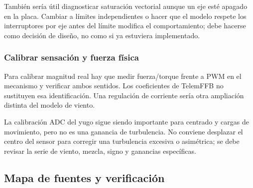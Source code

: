 \documentclass[11pt,a4paper]{article}
\begin{document}
También sería útil diagnosticar saturación vectorial aunque un eje esté apagado en la placa. Cambiar a límites independientes o hacer que el modelo respete los interruptores por eje antes del límite modifica el comportamiento; debe hacerse como decisión de diseño, no como si ya estuviera implementado.

\subsubsection{Calibrar sensación y fuerza física}
Para calibrar magnitud real hay que medir fuerza/torque frente a PWM en el mecanismo y verificar ambos sentidos. Los coeficientes de TelemFFB no sustituyen esa identificación. Una regulación de corriente sería otra ampliación distinta del modelo de viento.

La calibración ADC del yugo sigue siendo importante para centrado y cargas de movimiento, pero no es una ganancia de turbulencia. No conviene desplazar el centro del sensor para corregir una turbulencia excesiva o asimétrica; se debe revisar la serie de viento, mezcla, signo y ganancias específicas.

\subsection{Mapa de fuentes y verificación}
\end{document}
